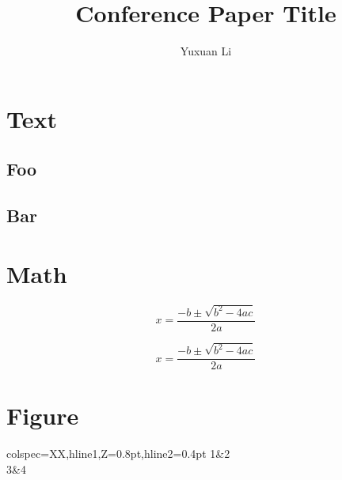 \documentclass{ieee-conference}
\title{Conference Paper Title}
\author{Yuxuan Li}
\begin{document}
\maketitle

\tableofcontents

\section{Text}

\lipsum

\subsection{Foo}

\lipsum[2]

\subsection{Bar}

\lipsum[3]

\section{Math}

\begin{equation}
    x=\frac{-b\pm\sqrt{b^2-4ac}}{2a}\label{eq:eq1}
\end{equation}

\begin{equation}
    x=\frac{-b\pm\sqrt{b^2-4ac}}{2a}\label{eq:eq2}
\end{equation}

\section{Figure}

\begin{table}
    \centering
    \caption{Table}
    \begin{tblr}{colspec={XX},hline{1,Z}={0.8pt},hline{2}={0.4pt}}
        1&2\\
        3&4\\
    \end{tblr}
\end{table}
\end{document}
